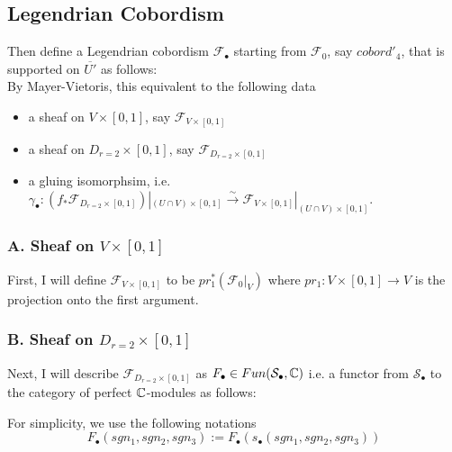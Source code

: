 \subsection*{Legendrian Cobordism}
Then define a Legendrian cobordism $\mathscr{F}_\bullet$ starting from $\mathscr{F}_0$, say $cobord'_4$, that is supported on $\overline{U'}$ as follows:\\

By Mayer-Vietoris, this equivalent to the following data
\begin{itemize}
\item a sheaf on $V\times [0,1]$, say $\mathscr{F}_{V\times [0,1]}$

\item a sheaf on $D_{r=2}\times [0,1]$, say $\mathscr{F}_{D_{r=2}\times [0,1]}$

\item a gluing isomorphsim, i.e. $\gamma_\bullet : (f_*\mathscr{F}_{D_{r=2}\times [0,1]})|_{(U\cap V)\times [0,1]} \xrightarrow{\sim} \mathscr{F}_{V\times [0,1]}|_{(U\cap V)\times [0,1]}$.
\end{itemize}
\subsubsection{A. Sheaf on $V\times [0,1]$}
First, I will define $\mathscr{F}_{V\times [0,1]}$ to be $pr_1^*(\mathscr{F}_0|_V)$ where $pr_1 : V \times [0,1] \rightarrow V$ is the projection onto the first argument.
\subsubsection{B. Sheaf on $D_{r=2}\times [0,1]$}
Next, I will describe $\mathscr{F}_{D_{r=2}\times [0,1]}$ as $F_\bullet \in Fun(\mathcal{S}_\bullet,\mathbb{C})$ i.e. a functor from $\mathcal{S}_\bullet$ to the category of perfect $\mathbb{C}$-modules as follows: 

For simplicity, we use the following notations
\[
F_\bullet(sgn_1,sgn_2,sgn_3):= F_\bullet(s_\bullet(sgn_1,sgn_2,sgn_3))
\]

